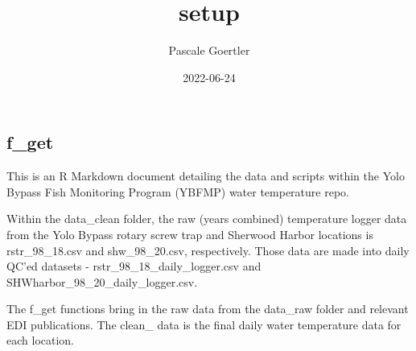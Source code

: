 \documentclass[
]{article}
\title{setup}
\author{Pascale Goertler}
\date{2022-06-24}
\newenvironment{Shaded}{\begin{snugshade}}{\end{snugshade}}
\newcommand{\CommentTok}[1]{\textcolor[rgb]{0.56,0.35,0.01}{\textit{#1}}}
\newcommand{\DecValTok}[1]{\textcolor[rgb]{0.00,0.00,0.81}{#1}}
\newcommand{\FunctionTok}[1]{\textcolor[rgb]{0.00,0.00,0.00}{#1}}
\newcommand{\NormalTok}[1]{#1}
\newcommand{\OtherTok}[1]{\textcolor[rgb]{0.56,0.35,0.01}{#1}}
\newcommand{\SpecialCharTok}[1]{\textcolor[rgb]{0.00,0.00,0.00}{#1}}
\newcommand{\StringTok}[1]{\textcolor[rgb]{0.31,0.60,0.02}{#1}}
\begin{document}
\maketitle

\hypertarget{f_get}{%
\subsection{f\_get}\label{f_get}}

This is an R Markdown document detailing the data and scripts within the
Yolo Bypass Fish Monitoring Program (YBFMP) water temperature repo.

Within the data\_clean folder, the raw (years combined) temperature
logger data from the Yolo Bypass rotary screw trap and Sherwood Harbor
locations is rstr\_98\_18.csv and shw\_98\_20.csv, respectively. Those
data are made into daily QC'ed datasets -
rstr\_98\_18\_daily\_logger.csv and
SHWharbor\_98\_20\_daily\_logger.csv.

The f\_get functions bring in the raw data from the data\_raw folder and
relevant EDI publications. The clean\_ data is the final daily water
temperature data for each location.

\begin{Shaded}
\end{Shaded}
\end{document}
